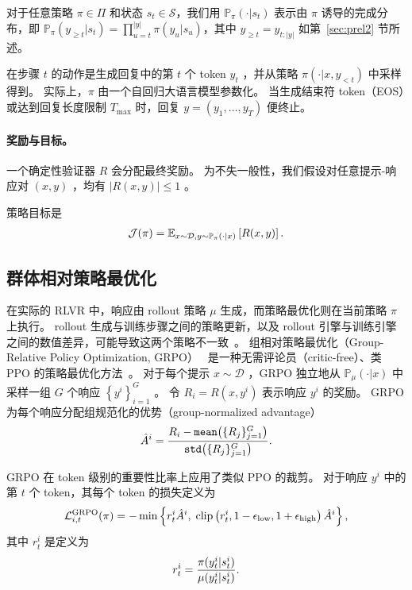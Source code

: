 \documentclass[11pt]{article}
\theoremstyle{definition}
\def\eql#1#2{\begin{equation}{#1}\begin{split}#2\end{split}\end{equation}}
\def\pr#1{\left( #1 \right ) }
\def\dr#1{\left\{#1\right\}}
\def\calD{\mathcal{D}}
\def\calJ{\mathcal{J}}
\def\calL{\mathcal{L}}
\def\calS{\mathcal{S}}
\newcommand \eps{\epsilon}
\def\prb#1{\big( #1 \big)}
\newcommand\adv{\hat{A}}
\newcommand\tpi{\pi}
\newcommand\cpi{\mathbb{P}_{\pi}}
\newcommand\cmu{\mathbb{P}_{\mu}}
\newcommand\policyspace{\Pi}
\begin{document}
对于任意策略 $\tpi\in \policyspace$ 和状态 $s_t\in \calS$，我们用 $\mathbb{P}_{\pi}(\cdot | s_t)$ 表示由 $\tpi$ 诱导的完成分布，即 $\mathbb{P}_{\pi}(y_{\geq t}| s_t) = \prod_{u=t}^{|y|}\pi(y_u|s_u)$，其中 $y_{\geq t} = y_{t:|y|}$ 如第~\ref{sec:prel2} 节所述。 

在步骤 $t$  的动作是生成回复中的第 $t$ 个 token $y_t$ ，并从策略 $\tpi(\cdot | x, y_{<t})$ 中采样得到。  
实际上，$\pi$ 由一个自回归大语言模型参数化。  
当生成结束符 token（EOS）或达到回复长度限制 $T_{\max}$ 时，回复 $y = (y_1, \dots, y_T)$ 便终止。 

\paragraph{奖励与目标。}
一个确定性验证器 $R$ 会分配最终奖励。  
为不失一般性，我们假设对任意提示-响应对 $(x, y)$ ，均有 $|R(x, y)| \leq 1$ 。   

策略目标是  
\eql{\label{eq:J}}{
    \calJ(\pi)
    =
    \mathbb{E}_{x\sim \mathcal{D}, y\sim \cpi(\cdot| x)}
    \left[
    R(x,y)
    \right].
}

\subsection{群体相对策略最优化}
在实际的 RLVR 中，响应由 rollout 策略 $\mu$ 生成，而策略最优化则在当前策略 $\pi$ 上执行。  
rollout 生成与训练步骤之间的策略更新，以及 rollout 引擎与训练引擎之间的数值差异，可能导致这两个策略不一致~\cite{zheng2025stabilizing,qi2025defeating,qi2026rethinking,yao2026rethinking,yao2025rollout}。  
组相对策略最优化（Group-Relative Policy Optimization, GRPO）~\cite{shao2024deepseekmath} 是一种无需评论员（critic-free）、类 PPO 的策略最优化方法~\cite{schulman2017proximal}。  
对于每个提示 $x \sim \calD$ ，GRPO 独立地从 $\cmu(\cdot | x)$ 中采样一组 $G$ 个响应 $\dr{y^i}_{i=1}^{G}$ 。  
令 $R_i = R(x, y^i)$ 表示响应 $y^i$ 的奖励。  
GRPO 为每个响应分配组规范化的优势（group-normalized advantage）  
\eql{\label{eq:adv}}{
    \adv^i = \frac{R_i - \texttt{mean}\prb{\{R_j\}_{j=1}^{G}}}{\texttt{std}\prb{\{R_j\}_{j=1}^{G}}}.
}

GRPO 在 token 级别的重要性比率上应用了类似 PPO 的裁剪。  
对于响应 $y^i$ 中的第 $t$ 个 token，其每个 token 的损失定义为  
\eql{\label{eq:grpoloss}}{
    \calL_{i,t}^{\mathrm{GRPO}}(\pi) = -\min\dr{r_t^i\adv^i,\; \mathrm{clip}\pr{r_t^i, 1-\eps_{\mathrm{low}}, 1+\eps_{\mathrm{high}}}\adv^i},
}  
其中 $r_t^i$ 是定义为  
\eql{\label{eq:isratio}}{
    r_t^i = \frac{\pi(y_t^i | s_t^i)}{\mu(y_t^i | s_t^i)}.
}
\end{document}
